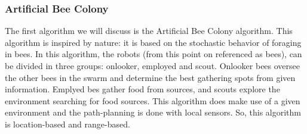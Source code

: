 \subsubsection{Artificial Bee Colony}
The first algorithm we will discuss is the Artificial Bee Colony algorithm. \cite{bhattacharjee2011multi}
This algorithm is inspired by nature: it is based on the stochastic behavior of foraging in bees.
In this algorithm, the robots (from this point on referenced as bees), can be divided in three groups: onlooker, employed and scout.
Onlooker bees oversee the other bees in the swarm and determine the best gathering spots from given information. 
Emplyed bes gather food from sources, and scouts explore the environment searching for food sources.
This algorithm does make use of a given environment and the path-planning is done with local sensors. 
So, this algorithm is location-based and range-based.

%

